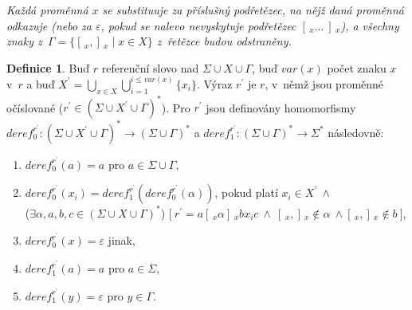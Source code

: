 \documentclass[thesis=B,czech]{FITthesis}[2019/12/23]
\theoremstyle{definition}
\newtheorem{definition}{Definice}[chapter]
\begin{document}
\emph{Každá proměnná $x$ se substituuje za příslušný podřetězec, na nějž daná proměnná odkazuje (nebo za $\varepsilon$, pokud se nalevo nevyskytuje podřetězec $[\,_x \dots \ ]\,_x$), a všechny znaky z~$\Gamma = \{ [\,_x , ]\,_x \mid x \in X \}$ z~řetězce budou odstraněny.}
\begin{definition}
Buď $r$ referenční slovo nad ${\Sigma \cup X \cup \Gamma}$, buď $var \left( x \right)$ počet znaku $x$ v~$r$ a buď $X^\prime = \bigcup\limits_{x \in X} \bigcup\limits_{i=1}^{i \leq var \left( x \right)} \{x_i\}$. Výraz $r^\prime$ je $r$, v~němž jsou proměnné očíslované ($r^\prime \in \left(\Sigma \cup X^\prime  \cup \Gamma \right)^\ast$). Pro $r^\prime$ jsou definovány homomorfismy $deref_0^{r^\prime} :  \left(\Sigma \cup X^\prime \cup \Gamma\right)^\ast \rightarrow  \left(\Sigma \cup \Gamma\right)^\ast$ a $deref_1^{r^\prime} : \left(\Sigma \cup \Gamma\right)^\ast \rightarrow \Sigma^\ast$ následovně:
\begin{enumerate}
	\item{$deref_0^{r^\prime} \left( a \right) = a$ pro $a \in \Sigma \cup \Gamma$, }
	\item{$deref_0^{r^\prime} \left( x_i \right) = deref_1^{r^\prime} \left( deref_0^{r^\prime} \left( \alpha \right) \right) $, pokud platí $x_i \in X^\prime \ \wedge $ \\ \bigg($\exists  \alpha, a, b, c \in \left(\Sigma \cup X \cup \Gamma\right)^\ast$\bigg) $\bigg[ \ r^\prime = a [\,_x \alpha  ]\,_x b x_i c \ \wedge \ [\,_x ,  ]\,_x \notin \alpha \ \wedge [\,_x ,  ]\,_x \notin b \ \bigg]$,}
        \item\label{rule:eps}{$deref_0^{r^\prime} \left( x \right) = \varepsilon$ jinak,}
	\item{$deref_1^{r^\prime} \left( a \right) = a$ pro $a \in \Sigma$,}
	\item\label{rule:6}{$deref_1^{r^\prime} \left( y \right) = \varepsilon$ pro $y \in \Gamma$.}
\end{enumerate}
\end{definition}
\end{document}
